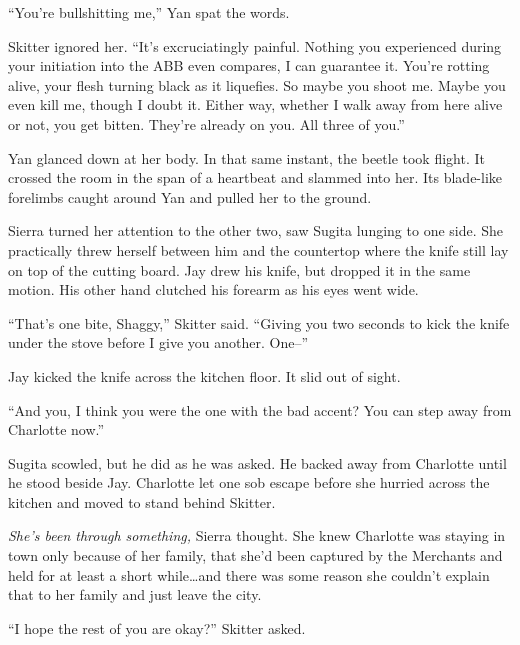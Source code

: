 ``You're bullshitting me,'' Yan spat the words.



Skitter ignored her.  ``It's excruciatingly painful.  Nothing you experienced during your initiation into the ABB even compares, I can guarantee it.  You're rotting alive, your flesh turning black as it liquefies.  So maybe you shoot me.  Maybe you even kill me, though I doubt it.  Either way, whether I walk away from here alive or not, you get bitten.  They're already on you.  All three of you.''



Yan glanced down at her body.  In that same instant, the beetle took flight.  It crossed the room in the span of a heartbeat and slammed into her.  Its blade-like forelimbs caught around Yan and pulled her to the ground.



Sierra turned her attention to the other two, saw Sugita lunging to one side.  She practically threw herself between him and the countertop where the knife still lay on top of the cutting board.  Jay drew his knife, but dropped it in the same motion.  His other hand clutched his forearm as his eyes went wide.



``That's one bite, Shaggy,'' Skitter said.  ``Giving you two seconds to kick the knife under the stove before I give you another.  One--''



Jay kicked the knife across the kitchen floor.  It slid out of sight.



``And you, I think you were the one with the bad accent?  You can step away from Charlotte now.''



Sugita scowled, but he did as he was asked.  He backed away from Charlotte until he stood beside Jay.  Charlotte let one sob escape before she hurried across the kitchen and moved to stand behind Skitter.



\emph{She's been through something, }Sierra thought.  She knew Charlotte was staying in town only because of her family, that she'd been captured by the Merchants and held for at least a short while\ldots and there was some reason she couldn't explain that to her family and just leave the city.



``I hope the rest of you are okay?''  Skitter asked.



